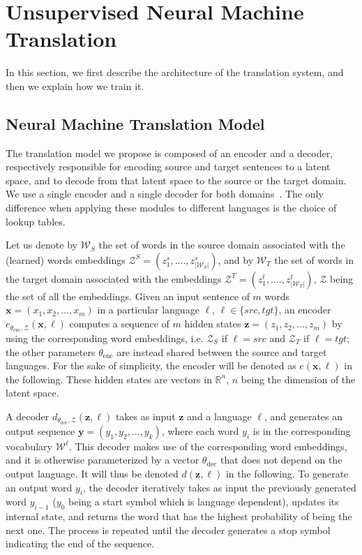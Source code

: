 \section{Unsupervised Neural Machine Translation}
\label{sec:model}
In this section, we first describe the architecture of the translation system, and then we explain how we train it.

\subsection{Neural Machine Translation Model}

The translation model we propose is composed of an encoder and a decoder, respectively responsible for encoding source and target sentences to a latent space, and to decode from that latent space to the source or the target domain. We use a single encoder and a single decoder for both domains~\citep{gmt17}. The only difference when applying these modules to different languages is the choice of lookup tables.

Let us denote by $\mathcal{W}_S$ the set of words in the source domain associated with the (learned) words embeddings $\mathcal{Z}^S=(z_1^s,....,z_{|\mathcal{W}_S|}^s)$, and by $\mathcal{W}_T$ the set of words in the target domain associated with the embeddings $\mathcal{Z}^T=(z_1^t,....,z_{|\mathcal{W}_T|}^t)$, $\mathcal{Z}$ being the set of all the embeddings. Given an input sentence of $m$ words $\bm{x} = (x_1, x_2, ..., x_m)$ in a particular language $\ell$, $\ell \in \{src,tgt\}$, an encoder $e_{\theta_\mathrm{enc},\mathcal{Z}}(\bm{x},\ell)$ computes a sequence of $m$ hidden states $\bm{z} = (z_1, z_2, ..., z_m)$ by using the corresponding word embeddings, i.e. $\mathcal{Z}_S$ if $\ell=src$ and $\mathcal{Z}_T$ if $\ell=tgt$; the other parameters $\theta_\mathrm{enc}$ are instead shared between the source and target languages. For the  sake of simplicity, the encoder will be denoted as $e(\bm{x},\ell)$ in the following. These hidden states are vectors in  $\mathbb{R}^n$, $n$ being the dimension of the latent space. 

A decoder $d_{\theta_\mathrm{dec},\mathcal{Z}}(\bm{z},\ell)$ takes as input $\bm{z}$ and a language $\ell$, and generates an output sequence $\bm{y} = (y_1, y_2, ..., y_k)$, where each word $y_i$ is in the corresponding vocabulary $\mathcal{W}^{\ell}$. This decoder makes use of the corresponding word embeddings, and it is otherwise parameterized by a vector $\theta_\mathrm{dec}$ that does not depend on the output language. It will thus be denoted $d(\bm{z},\ell)$ in the following. To generate an output word $y_i$, the decoder iteratively takes as input the previously generated word $y_{i - 1}$ ($y_0$ being a start symbol which is language dependent), updates its internal state, and returns the word that has the highest probability of being the next one. The process is repeated until the decoder generates a stop symbol indicating the end of the sequence. 

